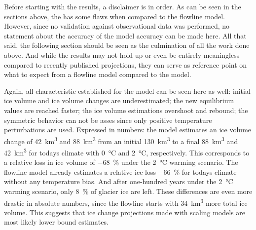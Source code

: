     Before starting with the results, a disclaimer is in order. As can be seen in the sections above, the \vas{} has some flaws when compared to the flowline model. However, since no validation against observational data was performed, no statement about the accuracy of the model accuracy can be made here. All that said, the following section should be seen as the culmination of all the work done above. And while the results may not hold up or even be entirely meaningless compared to recently published projections, they can serve as reference point on what to expect from a flowline model compared to the \vas{} model.

    Again, all characteristic established for the \vas{} model can be seen here as well: initial ice volume and ice volume changes are underestimated; the new equilibrium values are reached faster; the ice volume estimations overshoot and rebound; the symmetric behavior can not be asses since only positive temperature perturbations are used. Expressed in numbers: the \vas{} model estimates an ice volume change of \SI{42}{\cubic\kilo\meter} and \SI{88}{\cubic\kilo\meter} from an initial \SI{130}{\cubic\kilo\meter} to a final \SI{88}{\cubic\kilo\meter} and \SI{42}{\cubic\kilo\meter} for todays climate with \SI{0}{\celsius} and \SI{+2}{\celsius}, respectively. This corresponds to a relative loss in ice volume of \SI{-68}{\percent} under the \SI{+2}{\celsius} warming scenario. The flowline model already estimates a relative ice loss \SI{-66}{\percent} for todays climate without any temperature bias. And after one-hundred years under the \SI{+2}{\celsius} warming scenario, only \SI{8}{\percent} of glacier ice are left. These differences are even more drastic in absolute numbers, since the flowline starts with \SI{34}{\cubic\kilo\meter} more total ice volume. This suggests that ice change projections made with scaling models are most likely lower bound estimates.

